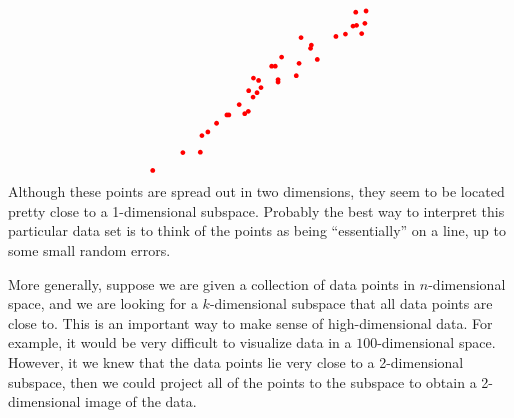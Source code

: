 \begin{equation}
\begin{tikzpicture}[baseline=-0.5ex]
    \fill[color=red] (0.39,0.09) circle (0.06);
    \fill[color=red] (-1.38,-1.17) circle (0.06);
    \fill[color=red] (-0.36,-0.65) circle (0.06);
    \fill[color=red] (1.38,0.66) circle (0.06);
    \fill[color=red] (1.85,1.24) circle (0.06);
    \fill[color=red] (2.35,1.85) circle (0.06);
    \fill[color=red] (0.85,0.25) circle (0.06);
    \fill[color=red] (-0.23,0.19) circle (0.06);
    \fill[color=red] (-0.90,-0.74) circle (0.06);
    \fill[color=red] (2.50,1.31) circle (0.06);
    \fill[color=red] (-0.45,-0.71) circle (0.06);
    \fill[color=red] (0.92,0.56) circle (0.06);
    \fill[color=red] (0.97,1.21) circle (0.06);
    \fill[color=red] (-0.85,-0.74) circle (0.06);
    \fill[color=red] (-0.10,0.13) circle (0.06);
    \fill[color=red] (0.32,0.49) circle (0.06);
    \fill[color=red] (2.58,1.57) circle (0.06);
    \fill[color=red] (-0.59,-0.48) circle (0.06);
    \fill[color=red] (2.28,1.50) circle (0.06);
    \fill[color=red] (1.21,0.94) circle (0.06);
    \fill[color=red] (-0.35,-0.13) circle (0.06);
    \fill[color=red] (-1.53,-1.26) circle (0.06);
    \fill[color=red] (-2.77,-2.14) circle (0.06);
    \fill[color=red] (1.23,1.02) circle (0.06);
    \fill[color=red] (2.61,1.88) circle (0.06);
    \fill[color=red] (-0.04,-0.05) circle (0.06);
    \fill[color=red] (2.09,1.30) circle (0.06);
    \fill[color=red] (2.37,1.52) circle (0.06);
    \fill[color=red] (-2.01,-1.69) circle (0.06);
    \fill[color=red] (0.48,0.72) circle (0.06);
    \fill[color=red] (0.23,0.49) circle (0.06);
    \fill[color=red] (-1.16,-0.95) circle (0.06);
    \fill[color=red] (-0.14,-0.18) circle (0.06);
    \fill[color=red] (-1.57,-1.68) circle (0.06);
    \fill[color=red] (0.39,0.15) circle (0.06);
    \fill[color=red] (-0.24,-0.29) circle (0.06);
  \end{tikzpicture}
\end{equation}
Although these points are spread out in two dimensions, they seem to
be located pretty close to a 1-dimensional subspace. Probably the best
way to interpret this particular data set is to think of the points as
being ``essentially'' on a line, up to some small random errors.

More generally, suppose we are given a collection of data points in
$n$-dimensional space, and we are looking for a $k$-dimensional
subspace that all data points are close to.  This is an important way
to make sense of high-dimensional data. For example, it would be very
difficult to visualize data in a $100$-dimensional space. However, it
we knew that the data points lie very close to a 2-dimensional
subspace, then we could project all of the points to the subspace to
obtain a 2-dimensional image of the data.

